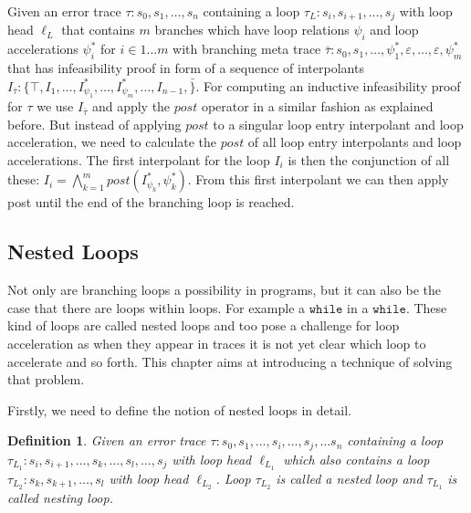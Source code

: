 \documentclass{article}
\newtheorem{mydef}{Definition}
\begin{document}
Given an error trace $\tau: s_0, s_1, \ldots, s_n$ containing a loop $\tau_L: s_i, s_{i+1}, \ldots, s_j$ with loop head $\ell_L$ that contains $m$ branches which have loop relations $\psi_i$ and loop accelerations $\psi_{i}^*$ for $i \in 1 \ldots m$ with branching meta trace $\bar{\tau}: s_0, s_1, \ldots, \psi_{1}^*, \varepsilon, \ldots, \varepsilon, \psi_{m}^*$ that has infeasibility proof in form of a sequence of interpolants $I_{\bar{\tau}}: \{\top, I_1, \ldots, I_{\psi_{1}}^*, \ldots, I_{\psi_{m}}^*, \ldots, I_{n - 1}, \bar \}$. For computing an inductive infeasibility proof for $\tau$ we use $I_{\bar{\tau}}$ and apply the $post$ operator in a similar fashion as explained before. But instead of applying $post$ to a singular loop entry interpolant and loop acceleration, we need to calculate the $post$ of all loop entry interpolants and loop accelerations. The first interpolant for the loop $I_i$ is then the conjunction of all these: $I_i = \bigwedge_{k=1}^{m} post(I_{\psi_k}^*, \psi_k^*)$. From this first interpolant we can then apply post until the end of the branching loop is reached.


\subsection{Nested Loops}
Not only are branching loops a possibility in programs, but it can also be the case that there are loops within loops. For example a $\texttt{while}$ in a $\texttt{while}$. These kind of loops are called nested loops and too pose a challenge for loop acceleration as when they appear in traces it is not yet clear which loop to accelerate and so forth. This chapter aims at introducing a technique of solving that problem. \\ \par

Firstly, we need to define the notion of nested loops in detail.
\begin{mydef}
	Given an error trace $\tau: s_0, s_1, \ldots, s_i, \ldots, s_j, \ldots s_n$ containing a loop \\ $\tau_{L_1}: s_i, s_{i+1}, \ldots, s_k, \ldots, s_l, \ldots, s_j$ with loop head $\ell_{L_1}$ which also contains a loop $\tau_{L_2}: s_k, s_{k+1}, \ldots, s_l$ with loop head $\ell_{L_2}$.
	Loop $\tau_{L_2}$ is called a nested loop and $\tau_{L_1}$ is called nesting loop.
\end{mydef}
\end{document}
